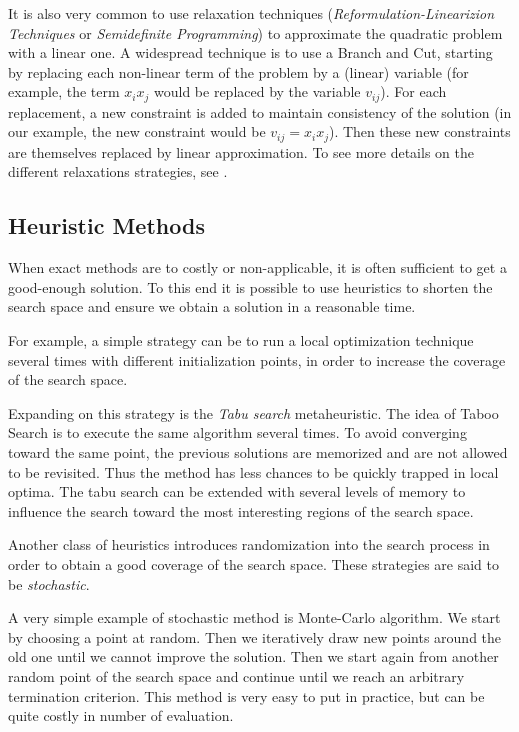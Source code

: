 It is also very common to use relaxation techniques (\emph{Reformulation-Linearizion Techniques} or \emph{Semidefinite Programming}) to approximate the quadratic problem with a linear one. A widespread technique is to use a Branch and Cut, starting by replacing each non-linear term of the problem by a (linear) variable (for example, the term $x_ix_j$ would be replaced by the variable $v_{ij}$). For each replacement, a new constraint is added to maintain consistency of the solution (in our example, the new constraint would be $v_{ij} = x_ix_j$). Then these new constraints are themselves replaced by linear approximation.
To see more details on the different relaxations strategies, see \cite{audet2000branch}.

\subsection{Heuristic Methods}

When exact methods are to costly or non-applicable, it is often sufficient to get a good-enough solution. To this end it is possible to use heuristics to shorten the search space and ensure we obtain a solution in a reasonable time.

For example, a simple strategy can be to run a local optimization technique several times with different initialization points, in order to increase the coverage of the search space.

Expanding on this strategy is the \emph{Tabu search} metaheuristic. The idea of Taboo Search is to execute the same algorithm several times. To avoid converging  toward the same point, the previous solutions are memorized and are not allowed to be revisited. Thus the method has less chances to be quickly trapped in local optima.
The tabu search can be extended with several levels of memory to influence the search toward the most interesting regions of the search space.

Another class of heuristics introduces randomization into the search process in order to obtain a good coverage of the search space.  These strategies are said to be \emph{stochastic}.

A very simple example of stochastic method is Monte-Carlo algorithm. We start by choosing a point at random. Then we iteratively draw new points around the old one until we cannot improve the solution. Then we start again from another random point of the search space and continue until we reach an arbitrary termination criterion.
This method is very easy to put in practice, but can be quite costly in number of evaluation.

